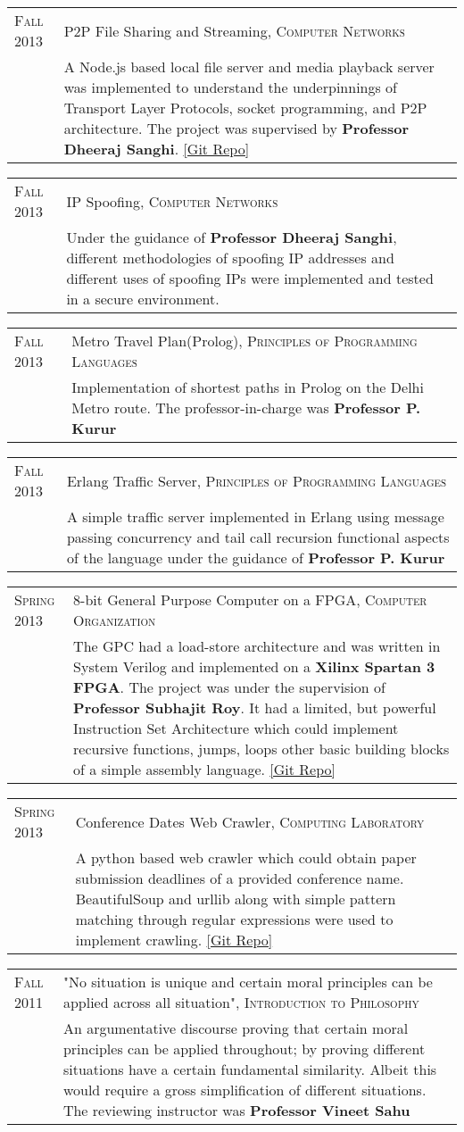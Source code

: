 \documentclass[a4paper,10pt]{article} %
\newcommand{\project}[3]{
    \begin{tabular}{>{\raggedleft}p{2.2cm}|p{17cm}}
        \textsc{#1} & \textcolor{NavyBlue}{#2} \\
                    & \footnotesize{#3} \\
    \end{tabular}
}
\begin{document}
\project {Fall 2013}
         {P2P File Sharing and Streaming, \textsc{Computer Networks}}
         {A Node.js based local file server and media playback server was implemented
          to understand the underpinnings of Transport Layer Protocols, socket programming,
          and P2P architecture.  The project was supervised by \textbf{Professor Dheeraj Sanghi}.
          \href{https://github.com/srijanshetty/nodesock} {[Git Repo]}}

\project {Fall 2013}
         {IP Spoofing, \textsc{Computer Networks}}
         {Under the guidance of \textbf{Professor Dheeraj Sanghi}, different methodologies
          of spoofing IP addresses and different uses of spoofing IPs were implemented and tested
          in a secure environment.}

\project {Fall 2013}
         {Metro Travel Plan(Prolog), \textsc{Principles of Programming Languages}}
         {Implementation of shortest paths in Prolog on the Delhi Metro route.
          The professor-in-charge was \textbf{Professor P. Kurur}}

\project {Fall 2013}
         {Erlang Traffic Server, \textsc{Principles of Programming Languages}}
         {A simple traffic server implemented in Erlang using message passing
          concurrency and tail call recursion functional aspects of the language under the
          guidance of \textbf{Professor P. Kurur}}

\project {Spring 2013}
         {8-bit General Purpose Computer on a FPGA, \textsc{Computer Organization}}
         {The GPC had a load-store architecture and was written in System Verilog and
          implemented on a \textbf{Xilinx Spartan 3 FPGA}.  The project was under the
          supervision of \textbf{Professor Subhajit Roy}.  It had a limited, but powerful
          Instruction Set Architecture which could implement recursive functions, jumps,
          loops  other basic building blocks of a simple assembly language.
          \href{https://github.com/srijanshetty/220_y11} {[Git Repo]}}

\project {Spring 2013}
         {Conference Dates Web Crawler, \textsc{Computing Laboratory}}
         {A python based web crawler which could obtain paper submission
          deadlines of a provided conference name.  BeautifulSoup and urllib along
          with simple pattern matching through regular expressions were used to implement crawling.
          \href{https://github.com/srijanshetty/crawler} {[Git Repo]}}

\project {Fall 2011}
         {"No situation is unique and certain moral principles can be applied across all situation",
          \textsc{Introduction to Philosophy}}
         {An argumentative discourse proving that certain moral principles
          can be applied throughout; by proving different situations have a certain
          fundamental similarity.  Albeit this would require a gross simplification of
          different situations.  The reviewing instructor was \textbf{Professor Vineet Sahu}}
\end{document}
